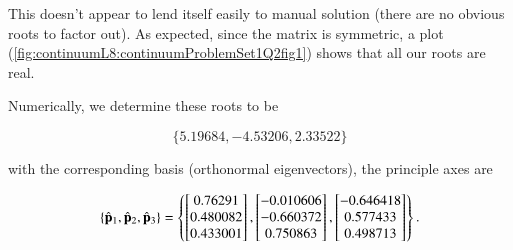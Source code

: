 {This doesn't appear to lend itself easily to manual solution (there are no obvious roots to factor out).  As expected, since the matrix is symmetric, a plot (\ref{fig:continuumL8:continuumProblemSet1Q2fig1}) shows that all our roots are real.


Numerically, we determine these roots to be

\begin{equation}\label{eqn:continuumProblemSet1:310}
\{5.19684, -4.53206, 2.33522\}
\end{equation}

with the corresponding basis (orthonormal eigenvectors), the principle axes are

\begin{equation}\label{eqn:continuumProblemSet1:330}
\left\{
\hat{\mathbf{p}}_1,
\hat{\mathbf{p}}_2,
\hat{\mathbf{p}}_3
\right\}
=
\left\{
\begin{bmatrix}
0.76291 \\
0.480082 \\
0.433001
\end{bmatrix},
\begin{bmatrix}
-0.010606 \\
-0.660372 \\
0.750863
\end{bmatrix},
\begin{bmatrix}
-0.646418 \\
0.577433 \\
0.498713
\end{bmatrix}
\right\}.
\end{equation}

} %



